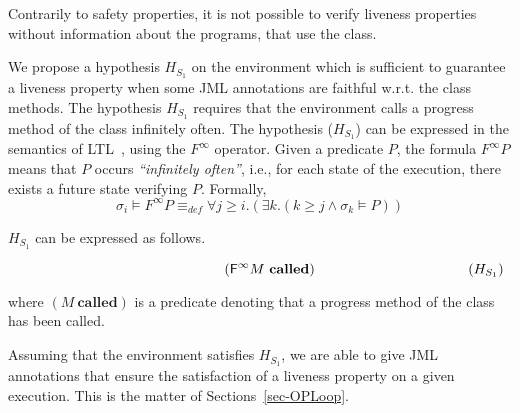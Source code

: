 





Contrarily to safety properties, it is not possible to verify liveness
properties without information about the programs, that use 
the class. 

We propose a hypothesis $H_{S_1}$ on the environment which is sufficient to
guarantee a liveness property when some JML annotations are faithful w.r.t.
the class methods. The hypothesis $H_{S_1}$ requires that the environment
calls a progress method of the class infinitely often.  The hypothesis
($H_{S_1}$) can be expressed in the semantics of LTL~\cite{pnueli77}, using
the $F^{\infty}$ operator. %
Given a predicate $P$, the formula $F^{\infty} P$  
means that $P$ occurs \textit{``infinitely often''}, i.e., for each state
of the execution, there exists a future state verifying $P$. Formally,
$$\sigma_i \models F^{\infty} P \equiv_{def} \forall j \geq i . (\exists k
. ( k\geq j \wedge \sigma_k \models P))$$

$H_{S_1}$ can be expressed as follows.

$$ \hspace*{15em} (\mathsf{F^{\infty}} M ~ \mathbf{called})
  \hspace*{11em} (H_{S_1})$$


where  $(M ~ \mathbf{called})$ is a predicate denoting 
that a progress method of the class has been called.



Assuming that the environment satisfies $H_{S_1}$, we are able to give JML
annotations that ensure the satisfaction of a liveness property on a given
execution. This is the matter of Sections~\ref{sec-OPLoop}.








